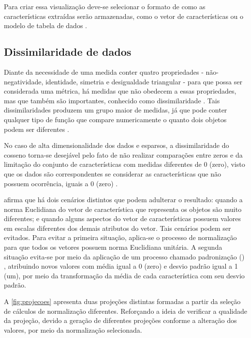 		
		Para criar essa visualização deve-se selecionar o formato
		de como as características extraídas serão armazenadas, como o vetor de
		características ou o modelo de tabela de dados \cite{de2003}.
		
		\subsection{Dissimilaridade de dados}
		\label{subsec:dissimilaridade}
			Diante da necessidade de uma medida conter quatro propriedades - não-negatividade,
			identidade, simetria e desigualdade triangular - para que possa ser considerada
			uma métrica, há medidas que não obedecem a essas propriedades, mas que também
			são importantes, conhecido como dissimilaridade \cite{phd:paulovich}. Tais
			dissimilaridades produzem um grupo maior de medidas, já que pode conter qualquer
			tipo de função que compare numericamente o quanto dois objetos podem ser
			diferentes \cite{Tan:2005:IDM:1095618}.
			
			No caso de alta	dimensionalidade dos dados e esparsos, a dissimilaridade do
			cosseno torna-se desejável pelo fato de não realizar comparações entre zeros e
			da limitação do conjunto de características com medidas diferentes de 0 (zero),
			visto que os dados são correspondentes se considerar as características
			que não possuem ocorrência, iguais a $0$ (zero) \cite{Tan:2005:IDM:1095618}.
			
			 afirma que há dois cenários distintos que podem
			adulterar o resultado: quando a norma Euclidiana do vetor de característica
			que representa os objetos são muito diferentes; e quando alguns aspectos
			do vetor de características possuem valores em escalas diferentes dos demais
			atributos do vetor. Tais cenários podem ser evitados. Para evitar a primeira
			situação, aplica-se o processo de normalização para que todos os vetores possuem
			norma Euclidiana unitária. A segunda situação evita-se por meio da
			aplicação de um processo chamado padronização ()
			\cite{Tan:2005:IDM:1095618}, atribuindo novos valores com média igual a 0 (zero)
			e desvio padrão igual a 1 (um), por meio da transformação da média de cada
			característica com seu desvio padrão.
			
			A \cref{fig:projecoes} apresenta duas projeções distintas formadas a partir da
			seleção de cálculos de normalização diferentes. Reforçando a ideia de verificar
			a qualidade da projeção, devido a geração de diferentes projeções conforme a
			alteração dos valores, por meio da normalização selecionada.
			
